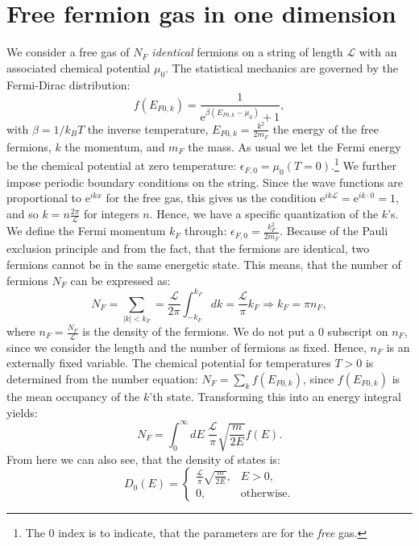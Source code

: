 \section{Free fermion gas in one dimension} \label{sec.chemicalpotential.freegas}
We consider a free gas of $N_F$ \textit{identical} fermions on a string of length $\mathcal{L}$ with an associated chemical potential $\mu_0$. The statistical mechanics are governed by the Fermi-Dirac distribution:
\begin{equation}
f(E_{F0,k}) = \frac{1}{\text{e}^{\beta(E_{F0,k}-\mu_0)} + 1},
\end{equation}
with $\beta = 1/k_BT$ the inverse temperature, $E_{F0,k} = \frac{k^2}{2m_F}$ the energy of the free fermions, $k$ the momentum, and $m_F$ the mass. As usual we let the Fermi energy be the chemical potential at zero temperature: $\epsilon_{F,0} = \mu_0(T=0)$.\footnote{The 0 index is to indicate, that the parameters are for the \textit{free} gas.} We further impose periodic boundary conditions on the string. Since the wave functions are proportional to $\text{e}^{ikx}$ for the free gas, this gives us the condition $\text{e}^{ik\mathcal{L}} = \text{e}^{ik\cdot 0} = 1$, and so $k = n\frac{2\pi}{\mathcal{L}}$ for integers $n$. Hence, we have a specific quantization of the $k$'s. We define the Fermi momentum $k_F$ through: $\epsilon_{F,0} = \frac{k_F^2}{2m_F}$. Because of the Pauli exclusion principle and from the fact, that the fermions are identical, two fermions cannot be in the same energetic state. This means, that the number of fermions $N_F$ can be expressed as:
\begin{equation}
N_F = \sum_{|k|< k_F} = \frac{\mathcal{L}}{2\pi} \int_{-k_F}^{k_F} dk = \frac{\mathcal{L}}{\pi} k_F \Rightarrow k_F = \pi n_F, 
\label{eq.relationkfnf}
\end{equation}
where $n_F = \frac{N_F}{\mathcal{L}}$ is the density of the fermions. We do not put a 0 subscript on $n_F$, since we consider the length and the number of fermions as fixed. Hence, $n_F$ is an externally fixed variable. The chemical potential for temperatures $T>0$ is determined from the number equation: $N_F = \sum_k f(E_{F0,k})$, since $f(E_{F0,k})$ is the mean occupancy of the $k$'th state. Transforming this into an energy integral yields:
\begin{equation}
N_F = \int_0^\infty dE \; \frac{\mathcal{L}}{\pi}\sqrt{\frac{m}{2E}} f(E). 
\label{eq.numberequationfreegas}
\end{equation}
From here we can also see, that the density of states is:
\begin{equation}
D_0(E) = \left\{\begin{matrix}
 \frac{\mathcal{L}}{\pi}\sqrt{\frac{m}{2E}}, & E > 0,  \\ 
 0, & \text{otherwise}. 
\end{matrix}\right. 
\label{eq.densityofstatesfreegas}
\end{equation}
